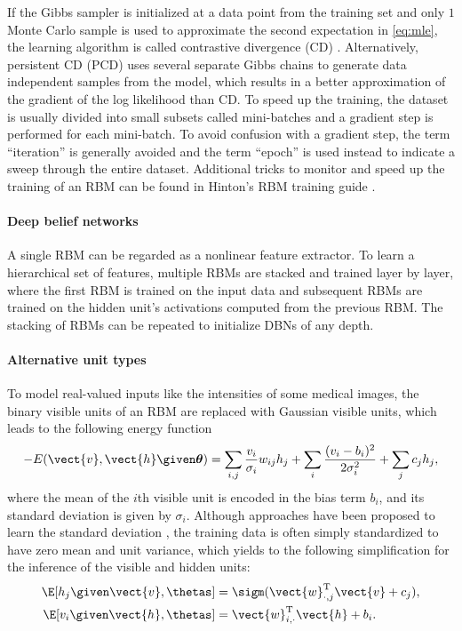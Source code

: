 If the Gibbs sampler is initialized at a data point from the training set and
only $1$ Monte Carlo sample is used to approximate the second expectation in
\eqref{eq:mle}, the learning algorithm is called contrastive divergence (CD)
\citep{hinton2002}. Alternatively, persistent CD (PCD) \citep{tieleman2008} uses
several separate Gibbs chains to generate data independent samples from the
model, which results in a better approximation of the gradient of the log
likelihood than CD. To speed up the training, the dataset is usually divided
into small subsets called mini-batches and a gradient step is performed for each
mini-batch. To avoid confusion with a gradient step, the term ``iteration'' is
generally avoided and the term ``epoch'' is used instead to indicate a sweep
through the entire dataset. Additional tricks to monitor and speed up the
training of an RBM can be found in Hinton's RBM training guide
\citep{hinton2010a}.

\paragraph{Deep belief networks}

A single RBM can be regarded as a nonlinear feature extractor. To learn a
hierarchical set of features, multiple RBMs are stacked and trained layer by
layer, where the first RBM is trained on the input data and subsequent RBMs are
trained on the hidden unit's activations computed from the previous RBM. The
stacking of RBMs can be repeated to initialize DBNs of any depth.

\paragraph{Alternative unit types}

To model real-valued inputs like the intensities of some medical images, the
binary visible units of an RBM are replaced with Gaussian visible units, which
leads to the following energy function
\begin{equation} 
-E(\vect{v}, \vect{h}\given \boldsymbol{\theta}) = \sum_{i,
j}\frac{v_i}{\sigma_i} w_{ij} h_j + \sum_i \frac{(v_i - b_i)^2}{2\sigma_i^2} +
\sum_j c_j h_j,
\end{equation}
where the mean of the $i$th visible unit is encoded in the bias term $b_i$,
and its standard deviation is given by $\sigma_i$. Although approaches have been
proposed to learn the standard deviation \citep{cho2011}, the
training data is often simply standardized to have zero mean and unit variance,
which yields to the following simplification for the inference of the visible
and hidden units:
\begin{align} 
\label{eq:ghgivenv}
\E[h_j \given \vect{v}, \thetas] &=
\sigm(\vect{w}_{\cdot,j}^\text{T}\vect{v} + c_j),\\
\label{eq:gvgivenh}
\E[v_i \given \vect{h}, \thetas] &= \vect{w}_{i,\cdot}^\text{T}\vect{h} +
b_i.
\end{align}

